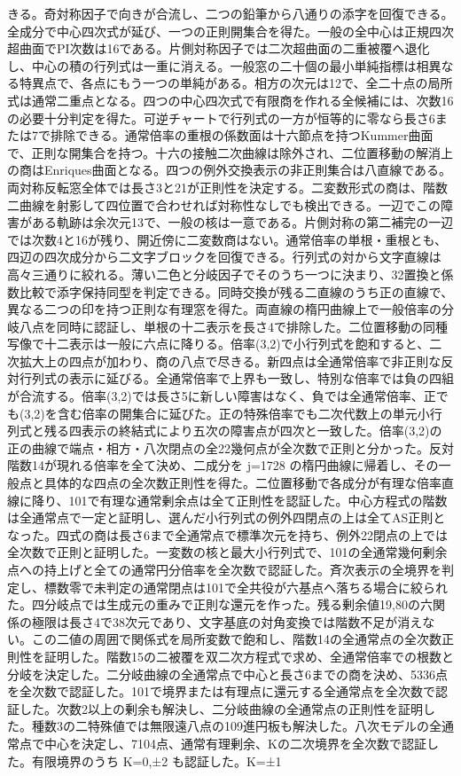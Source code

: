 \documentclass[11pt,a4paper]{ltjsarticle}
\begin{document}
きる。奇対称因子で向きが合流し、二つの鉛筆から八通りの添字を回復できる。全成分で中心四次式が延び、一つの正則開集合を得た。一般の全中心は正規四次超曲面でPI次数は16である。片側対称因子では二次超曲面の二重被覆へ退化し、中心の積の行列式は一重に消える。一般窓の二十個の最小単純指標は相異なる特異点で、各点にもう一つの単純がある。相方の次元は12で、全二十点の局所式は通常二重点となる。四つの中心四次式で有限商を作れる全候補には、次数16の必要十分判定を得た。可逆チャートで行列式の一方が恒等的に零なら長さ6または7で排除できる。通常倍率の重根の係数面は十六節点を持つKummer曲面で、正則な開集合を持つ。十六の接触二次曲線は除外され、二位置移動の解消上の商はEnriques曲面となる。四つの例外交換表示の非正則集合は八直線である。両対称反転窓全体では長さ3と21が正則性を決定する。二変数形式の商は、階数二曲線を射影して四位置で合わせれば対称性なしでも検出できる。一辺でこの障害がある軌跡は余次元13で、一般の核は一意である。片側対称の第二補完の一辺では次数4と16が残り、開近傍に二変数商はない。通常倍率の単根・重根とも、四辺の四次成分から二文字ブロックを回復できる。行列式の対から文字直線は高々三通りに絞れる。薄い二色と分岐因子でそのうち一つに決まり、32置換と係数比較で添字保持同型を判定できる。同時交換が残る二直線のうち正の直線で、異なる二つの印を持つ正則な有理窓を得た。両直線の楕円曲線上で一般倍率の分岐八点を同時に認証し、単根の十二表示を長さ4で排除した。二位置移動の同種写像で十二表示は一般に六点に降りる。倍率(3,2)で小行列式を飽和すると、二次拡大上の四点が加わり、商の八点で尽きる。新四点は全通常倍率で非正則な反対行列式の表示に延びる。全通常倍率で上界も一致し、特別な倍率では負の四組が合流する。倍率(3,2)では長さ5に新しい障害はなく、負では全通常倍率、正でも(3,2)を含む倍率の開集合に延びた。正の特殊倍率でも二次代数上の単元小行列式と残る四表示の終結式により五次の障害点が四次と一致した。倍率(3,2)の正の曲線で端点・相方・八次閉点の全22幾何点が全次数で正則と分かった。反対階数14が現れる倍率を全て決め、二成分を j=1728 の楕円曲線に帰着し、その一般点と具体的な四点の全次数正則性を得た。二位置移動で各成分が有理な倍率直線に降り、101で有理な通常剰余点は全て正則性を認証した。中心方程式の階数は全通常点で一定と証明し、選んだ小行列式の例外四閉点の上は全てAS正則となった。四式の商は長さ6まで全通常点で標準次元を持ち、例外22閉点の上では全次数で正則と証明した。一変数の核と最大小行列式で、101の全通常幾何剰余点への持上げと全ての通常円分倍率を全次数で認証した。斉次表示の全境界を判定し、標数零で未判定の通常閉点は101で全共役が六基点へ落ちる場合に絞られた。四分岐点では生成元の重みで正則な還元を作った。残る剰余値19,80の六関係の極限は長さ4で38次元であり、文字基底の対角変換では階数不足が消えない。この二値の周囲で関係式を局所変数で飽和し、階数14の全通常点の全次数正則性を証明した。階数15の二被覆を双二次方程式で求め、全通常倍率での根数と分岐を決定した。二分岐曲線の全通常点で中心と長さ6までの商を決め、5336点を全次数で認証した。101で境界または有理点に還元する全通常点を全次数で認証した。次数2以上の剰余も解決し、二分岐曲線の全通常点の正則性を証明した。種数3の二特殊値では無限遠八点の109進円板も解決した。八次モデルの全通常点で中心を決定し、7104点、通常有理剰余、Kの二次境界を全次数で認証した。有限境界のうち K=0,±2 も認証した。K=±1 
\end{document}
